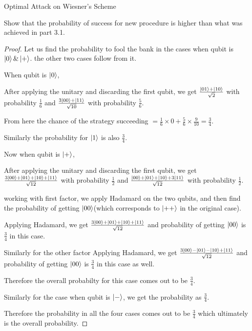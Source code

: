 \begin{solution}{Optimal Attack on Wiesner’s Scheme}\label{ques:x}
    \begin{question}
    Show that the probability of success for new procedure is higher than what was achieved
in part 3.1.
    \end{question}
    \tcblower{}
    \begin{proof}
    Let us find the probability to fool the bank in the cases when qubit is $\ket{0} \& \ket{+}$. the other two cases follow from it.

    When qubit is $\ket{0}$,

    After applying the unitary and discarding the first qubit, we get $\frac{\ket{01}+\ket{10}}{\sqrt{2}}$ with probability $\frac{1}{6}$ and $\frac{3\ket{00}+\ket{11}}{\sqrt{10}}$ with probability $\frac{5}{6}$.
    
    From here the chance of the strategy succeeding $=\frac{1}{6}\times 0 + \frac{5}{6}\times\frac{9}{10} = \frac{3}{4}$.

    Similarly the probability for $\ket{1}$ is also $\frac{3}{4}$.\newline

    Now when qubit is $\ket{+}$,

    After applying the unitary and discarding the first qubit, we get $\frac{3\ket{00}+\ket{01}+\ket{10}+\ket{11}}{\sqrt{12}}$ with probability $\frac{1}{2}$ and $\frac{\ket{00}+\ket{01}+\ket{10}+3\ket{11}}{\sqrt{12}}$ with probability $\frac{1}{2}$. 

    working with first factor, we apply Hadamard on the two qubits, and then find the probability of getting $\ket{00}$(which corresponds to $\ket{++}$ in the original case).

    Applying Hadamard, we get $\frac{3\ket{00}+\ket{01}+\ket{10}+\ket{11}}{\sqrt{12}}$ and probability of getting $\ket{00}$ is $\frac{3}{4}$ in this case.
    
    Similarly for the other factor Applying Hadamard, we get $\frac{3\ket{00}-\ket{01}-\ket{10}+\ket{11}}{\sqrt{12}}$ and probability of getting $\ket{00}$ is $\frac{3}{4}$ in this case as well.

    Therefore the overall probabilty for this case comes out to be $\frac{3}{4}$.

    Similarly for the case when qubit is $\ket{-}$, we get the probability as $\frac{3}{4}$.

    Therefore the probability in all the four cases comes out to be $\frac{3}{4}$ which ultimately is the overall probability.
    \end{proof}
\end{solution}
 